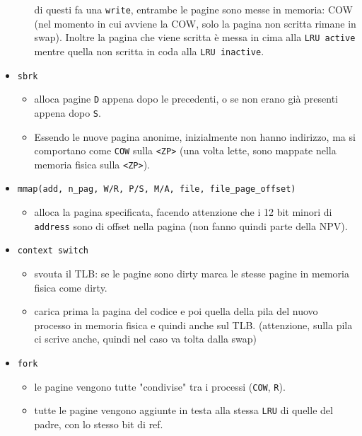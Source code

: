 \documentclass[12pt, a4paper]{report}
\begin{document}
\begin{itemize}
\begin{itemize}
		            di questi fa una \texttt{write}, entrambe le pagine sono
		            messe in memoria: COW (nel momento in cui avviene la COW,
		            solo la pagina non scritta rimane in swap). Inoltre la
		            pagina che viene scritta è messa in cima alla \texttt{LRU
			            active} mentre quella non scritta in coda alla \texttt{LRU
			            inactive}. \end{itemize}
	\item \texttt{sbrk}
	      \begin{itemize}
		      \item alloca pagine \texttt{D} appena dopo le precedenti, o se non
		            erano già presenti appena dopo \texttt{S}.
		      \item Essendo le nuove pagina anonime, inizialmente non hanno
		            indirizzo, ma si comportano come \texttt{COW} sulla
		            \texttt{<ZP>} (una volta lette, sono mappate nella memoria
		            fisica sulla \texttt{<ZP>}).
	      \end{itemize}
	\item \texttt{mmap(add, n\_pag, W/R, P/S, M/A, file, file\_page\_offset)}
	      \begin{itemize}
		      \item alloca la pagina specificata, facendo attenzione che i 12
		            bit minori di \texttt{address} sono di offset nella pagina
		            (non fanno quindi parte della NPV).
	      \end{itemize}
	\item \texttt{context switch}
	      \begin{itemize}
		      \item svouta il TLB: se le pagine sono dirty marca le stesse pagine
		            in memoria fisica come dirty.
		      \item carica prima la pagina del codice e poi quella della pila del
					nuovo processo in memoria fisica e quindi anche sul TLB.
					(attenzione, sulla pila ci scrive anche, quindi nel caso va
					tolta dalla swap)
			\end{itemize}
	\item \texttt{fork}
	      \begin{itemize}
		      \item le pagine vengono tutte "condivise" tra i processi
		            (\texttt{COW}, \texttt{R}).
		      \item tutte le pagine vengono aggiunte in testa alla stessa
		            \texttt{LRU} di quelle del padre, con lo stesso bit di ref.

\end{itemize}
\end{itemize}
\end{document}
